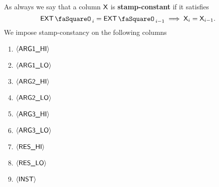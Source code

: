 As always we say that a column $\col{X}$ is \textbf{stamp-constant} if it satisfies
\[
	\extStamp_{i} = \extStamp_{i - 1}
	\implies
	\col{X}_{i} = \col{X}_{i - 1}.
\]
We impose stamp-constancy on the following columns 
\begin{multicols}{5}
\begin{enumerate}
	\item $\iArgOneHi$
	\item $\iArgOneLo$
	\item $\iArgTwoHi$
	\item $\iArgTwoLo$
	\item $\iArgTreHi$
	\item $\iArgTreLo$
	\item $\iResHi$
	\item $\iResLo$
	\item $\iInst$
\end{enumerate}
\end{multicols}
